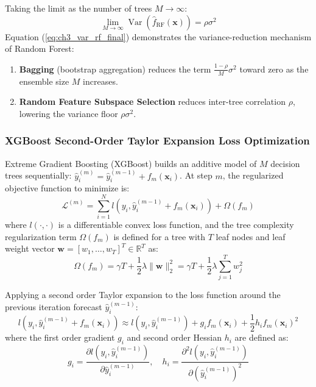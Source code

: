 Taking the limit as the number of trees $M \to \infty$:
\begin{equation}
\lim_{M \to \infty} \operatorname{Var}\left( \hat{f}_{\text{RF}}(\mathbf{x}) \right) = \rho \sigma^2
\end{equation}
Equation (\ref{eq:ch3_var_rf_final}) demonstrates the variance-reduction mechanism of Random Forest:
\begin{enumerate}
    \item \textbf{Bagging} (bootstrap aggregation) reduces the term $\frac{1-\rho}{M} \sigma^2$ toward zero as the ensemble size $M$ increases.
    \item \textbf{Random Feature Subspace Selection} reduces inter-tree correlation $\rho$, lowering the variance floor $\rho \sigma^2$.
\end{enumerate}

\subsubsection{XGBoost Second-Order Taylor Expansion Loss Optimization}
Extreme Gradient Boosting (XGBoost) \citep{chen2016xgboost} builds an additive model of $M$ decision trees sequentially: $\hat{y}_i^{(m)} = \hat{y}_i^{(m-1)} + f_m(\mathbf{x}_i)$. At step $m$, the regularized objective function to minimize is:
\begin{equation}
\mathcal{L}^{(m)} = \sum_{i=1}^N l\left( y_i, \hat{y}_i^{(m-1)} + f_m(\mathbf{x}_i) \right) + \Omega(f_m)
\label{eq:ch3_xgb_obj}
\end{equation}
where $l(\cdot, \cdot)$ is a differentiable convex loss function, and the tree complexity regularization term $\Omega(f_m)$ is defined for a tree with $T$ leaf nodes and leaf weight vector $\mathbf{w} = [w_1, \dots, w_T]^T \in \mathbb{R}^T$ as:
\begin{equation}
\Omega(f_m) = \gamma T + \frac{1}{2} \lambda \|\mathbf{w}\|_2^2 = \gamma T + \frac{1}{2} \lambda \sum_{j=1}^T w_j^2
\label{eq:ch3_xgb_reg}
\end{equation}

Applying a second order Taylor expansion to the loss function around the previous iteration forecast $\hat{y}_i^{(m-1)}$:
\begin{equation}
l\left( y_i, \hat{y}_i^{(m-1)} + f_m(\mathbf{x}_i) \right) \approx l\left( y_i, \hat{y}_i^{(m-1)} \right) + g_i f_m(\mathbf{x}_i) + \frac{1}{2} h_i f_m(\mathbf{x}_i)^2
\label{eq:ch3_taylor_loss}
\end{equation}
where the first order gradient $g_i$ and second order Hessian $h_i$ are defined as:
\begin{equation}
g_i = \frac{\partial l\left( y_i, \hat{y}_i^{(m-1)} \right)}{\partial \hat{y}_i^{(m-1)}}, \quad h_i = \frac{\partial^2 l\left( y_i, \hat{y}_i^{(m-1)} \right)}{\partial \left(\hat{y}_i^{(m-1)}\right)^2}
\label{eq:ch3_grad_hessian}
\end{equation}

